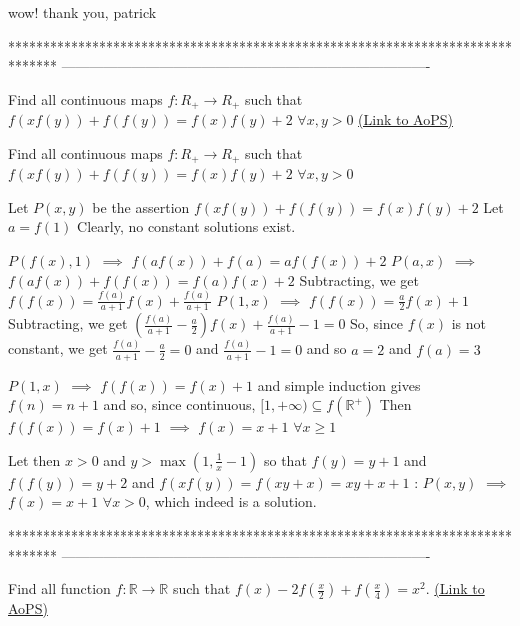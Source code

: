 \begin{solution}
	wow! thank you, patrick
\end{solution}
*******************************************************************************
-------------------------------------------------------------------------------

\begin{problem}
	Find all continuous maps $f : R_+ \rightarrow R_+$ such that $f(xf(y)) + f(f(y)) = f(x)f(y) +2$  $\forall x, y >0$
	\flushright \href{https://artofproblemsolving.com/community/c6h615217}{(Link to AoPS)}
\end{problem}



\begin{solution}
	\begin{tcolorbox}Find all continuous maps $f : R_+ \rightarrow R_+$ such that $f(xf(y)) + f(f(y)) = f(x)f(y) +2$  $\forall x, y >0$\end{tcolorbox}
Let $P(x,y)$ be the assertion $f(xf(y))+f(f(y))=f(x)f(y)+2$
Let $a=f(1)$
Clearly, no constant solutions exist.

$P(f(x),1)$ $\implies$ $f(af(x))+f(a)=af(f(x))+2$
$P(a,x)$ $\implies$ $f(af(x))+f(f(x))=f(a)f(x)+2$
Subtracting, we get $f(f(x))=\frac{f(a)}{a+1}f(x)+\frac{f(a)}{a+1}$
$P(1,x)$ $\implies$ $f(f(x))=\frac a2f(x)+1$
Subtracting, we get $\left(\frac{f(a)}{a+1}-\frac a2\right)f(x)+\frac{f(a)}{a+1}-1=0$
So, since $f(x)$ is not constant, we get $\frac{f(a)}{a+1}-\frac a2=0$ and $\frac{f(a)}{a+1}-1=0$ and so $a=2$ and $f(a)=3$

$P(1,x)$ $\implies$ $f(f(x))=f(x)+1$ and simple induction gives $f(n)=n+1$ and so, since continuous, $[1,+\infty)\subseteq f(\mathbb R^+)$
Then $f(f(x))=f(x)+1$ $\implies$ $f(x)=x+1$ $\forall x\ge 1$

Let then $x>0$ and $y>\max(1,\frac 1x-1)$ so that $f(y)=y+1$ and $f(f(y))=y+2$ and $f(xf(y))=f(xy+x)=xy+x+1$ :
$P(x,y)$ $\implies$ $\boxed{f(x)=x+1}$ $\forall x>0$, which indeed is a solution.
\end{solution}
*******************************************************************************
-------------------------------------------------------------------------------

\begin{problem}
	Find all function $f: \mathbb{R}\to\mathbb{R}$ such that $f(x)-2f(\frac{x}{2})+f(\frac{x}{4})=x^2$.
	\flushright \href{https://artofproblemsolving.com/community/c6h615311}{(Link to AoPS)}
\end{problem}



